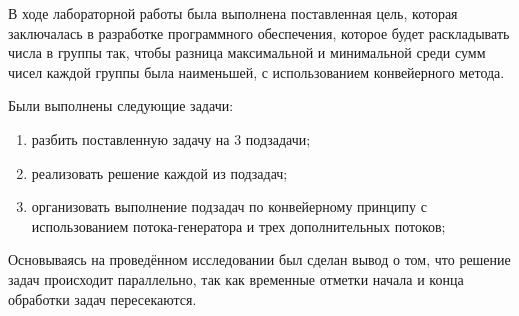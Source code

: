 
В ходе лабораторной работы была выполнена поставленная цель, которая заключалась в разработке программного обеспечения, которое будет раскладывать числа в группы  так, чтобы разница максимальной и минимальной среди сумм чисел каждой группы была наименьшей, с использованием конвейерного метода.


Были выполнены следующие задачи:
\begin{enumerate}
	\item разбить поставленную задачу на 3 подзадачи;
	\item реализовать решение каждой из подзадач;
	\item организовать выполнение подзадач по конвейерному принципу с использованием потока-генератора и трех дополнительных потоков;
\end{enumerate}


Основываясь на проведённом исследовании был сделан вывод о том, что решение задач происходит параллельно, так как временные отметки начала и конца обработки задач пересекаются.

